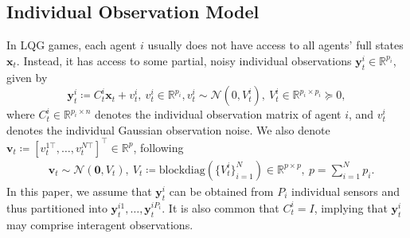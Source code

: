 \documentclass[letterpaper, 10 pt, conference]{ieeeconf}  %
\begin{document}
\subsection{Individual Observation Model}
In LQG games, each agent $i$ usually does not have access to all agents' full states $\textbf{x}_t$. Instead, it has access to some partial, noisy individual observations ${\textbf{y}_t^i\in\mathbb{R}^{p_i}}$, given by
\begin{equation}
        \textbf{y}_t^i\coloneqq C_t^i\textbf{x}_t+v_t^i,\  v_t^i\in\mathbb{R}^{p_i},v_t^i\sim\mathcal{N}(0,V_t^i),\ V_t^i\in\mathbb{R}^{p_i\times p_i}\succeq0,\label{eqn:ind_obs}
\end{equation}
where ${C_t^i\in\mathbb{R}^{p_i\times n}}$ denotes the individual observation matrix of agent $i$, and {$v_t^i$} denotes the individual Gaussian observation noise. 
We also denote $\textbf{v}_t\coloneqq[v_t^{1\top},\dots,v_t^{N\top}]^\top\in\mathbb{R}^p$, following
\begin{equation*}
    \begin{aligned}
        &\textbf{v}_t\sim\mathcal{N}(\textbf{0},V_t),\ V_t\coloneqq\text{blockdiag}(\{V_t^i\}_{i=1}^N)\in\mathbb{R}^{p\times p},\  p=\sum_{i=1}^Np_i.
    \end{aligned}
\end{equation*}
In this paper, we assume that $\textbf{y}_t^i$ can be obtained from $P_i$ individual sensors and thus partitioned into $\textbf{y}_t^{i1},\dots,\textbf{y}_t^{iP_i}$. It is also common that $C_t^i=I$, implying that $\textbf{y}_t^i$ may comprise interagent observations.
\end{document}
